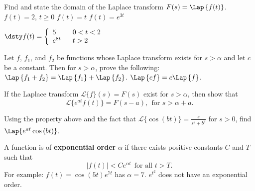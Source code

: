 \begin{enumerate}[resume]
  \ii Find and state the domain of the Laplace transform $F(s)=\Lap \left\{ f(t) \right\}$.
  \bb
\ii $f(t) = 2$, $t \geq 0$  \vfill
\ii $f(t) = t$ \vfill 
\ii $f(t) = e^{3t}$ \vfill
\clearpage

\ii $\dsty f(t) = \left\{ \begin{array}{ll} 
5 \ \ & 0 < t < 2 \\
e^{8t} \ \ & t >2 \end{array} \right.$ \vfill
\ee





\bs

\ii Let $f$, $f_1$, and $f_2$ be functions whose Laplace transform exists for $s > \alpha$ and let $c$ be a constant. Then for $s > \alpha$, prove the following:
\bb
\ii $\Lap \left\{ f_1 + f_2 \right\} = \Lap \left\{ f_1 \right\} + \Lap \left\{ f_2 \right\}$. \vfill
\ii $\Lap \left\{ cf \right\} = c \Lap \left\{ f \right\}$. \vfill
\ee
\end{enumerate}

\clearpage


\begin{enumerate}[resume]
\ii If the Laplace transform $\mathscr{L}\{ f \} (s)=F(s)$ exist for $s > \alpha$, then show that
\[ \mathscr{L}\{ e^{at}f(t) \}= F(s-a), \ \ \mbox{for } s > \alpha + a.\]

\vfill

\ii Using the property above and the fact that $\mathscr{L} \{ \cos{(bt)} \} = \frac{s}{s^2+b^2}$ for $s >0$, find
$\Lap \{ e^{at} \cos{(bt)} \}$.

\vfill

\end{enumerate}


A function is of \textbf{exponential order} $\alpha$ if there exists positive constants $C$ and $T$ such that
\[ \left| f(t) \right| < Ce^{\alpha t} \ \ \mbox{for all } t > T.\]
For example:
\bi
\ii $f(t) = \cos{(5t)}e^{7t}$ has $\alpha = 7$.
\ii $e^{t^2}$ does not have an exponential order.
\ei

